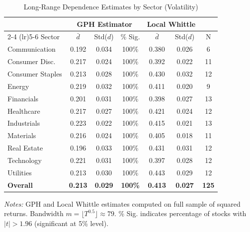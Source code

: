 \begin{table}[htbp]
\centering
\caption{Long-Range Dependence Estimates by Sector (Volatility)}
\label{tab:lrd_estimates}
\small
\begin{tabular}{lcccccc}
\toprule
 & \multicolumn{3}{c}{GPH Estimator} & \multicolumn{2}{c}{Local Whittle} & \\
\cmidrule(lr){2-4} \cmidrule(lr){5-6}
Sector & $\bar{d}$ & Std($d$) & \% Sig. & $\bar{d}$ & Std($d$) & N \\
\midrule
Communication & 0.192 & 0.034 & 100\% & 0.380 & 0.026 & 6 \\
Consumer Disc. & 0.217 & 0.024 & 100\% & 0.392 & 0.022 & 11 \\
Consumer Staples & 0.213 & 0.028 & 100\% & 0.430 & 0.032 & 12 \\
Energy & 0.219 & 0.032 & 100\% & 0.411 & 0.020 & 9 \\
Financials & 0.201 & 0.031 & 100\% & 0.398 & 0.027 & 13 \\
Healthcare & 0.217 & 0.027 & 100\% & 0.421 & 0.024 & 12 \\
Industrials & 0.223 & 0.022 & 100\% & 0.415 & 0.021 & 13 \\
Materials & 0.216 & 0.024 & 100\% & 0.405 & 0.018 & 11 \\
Real Estate & 0.196 & 0.033 & 100\% & 0.431 & 0.031 & 12 \\
Technology & 0.221 & 0.031 & 100\% & 0.397 & 0.028 & 12 \\
Utilities & 0.213 & 0.030 & 100\% & 0.443 & 0.029 & 12 \\
\midrule
\textbf{Overall} & \textbf{0.213} & \textbf{0.029} & \textbf{100\%} & \textbf{0.413} & \textbf{0.027} & \textbf{125} \\
\bottomrule
\end{tabular}
\begin{tablenotes}\small
\item \textit{Notes:} GPH and Local Whittle estimates computed on full sample of squared returns. Bandwidth $m = \lfloor T^{0.5} \rfloor \approx 79$. \% Sig. indicates percentage of stocks with $|t| > 1.96$ (significant at 5\% level).
\end{tablenotes}
\end{table}


